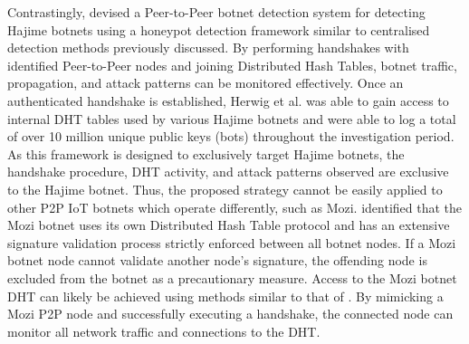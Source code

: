 Contrastingly, \citet{Herwig2019} devised a Peer-to-Peer botnet detection system for detecting Hajime botnets using a honeypot detection framework similar to centralised detection methods previously discussed. \citep{Bastos2019, Ceron2019} By performing handshakes with identified Peer-to-Peer nodes and joining Distributed Hash Tables, botnet traffic, propagation, and attack patterns can be monitored effectively. Once an authenticated handshake is established, Herwig et al. was able to gain access to internal DHT tables used by various Hajime botnets and were able to log a total of over 10 million unique public keys (bots) throughout the investigation period. As this framework is designed to exclusively target Hajime botnets, the handshake procedure, DHT activity, and attack patterns observed are exclusive to the Hajime botnet. Thus, the proposed strategy cannot be easily applied to other P2P IoT botnets which operate differently, such as Mozi. \citet{Netlab2019} identified that the Mozi botnet uses its own Distributed Hash Table protocol and has an extensive signature validation process strictly enforced between all botnet nodes. If a Mozi botnet node cannot validate another node's signature, the offending node is excluded from the botnet as a precautionary measure. Access to the Mozi botnet DHT can likely be achieved using methods similar to that of \citet{Herwig2019}. By mimicking a Mozi P2P node and successfully executing a handshake, the connected node can monitor all network traffic and connections to the DHT.